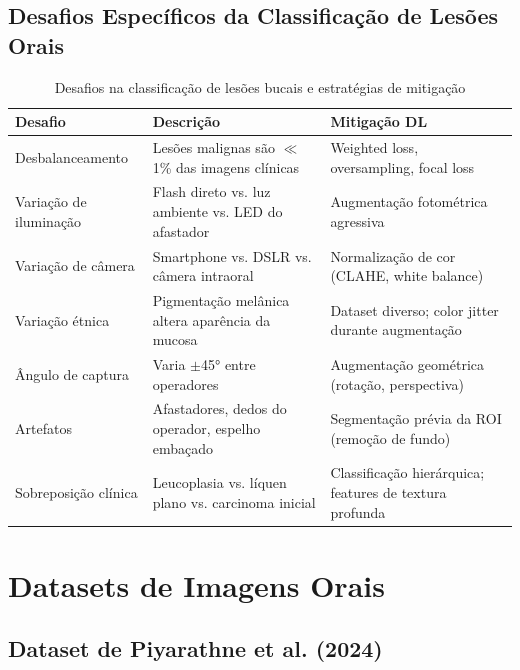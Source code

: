 \subsection{Desafios Específicos da Classificação de Lesões Orais}

\begin{table}[H]
  \centering
  \caption{Desafios na classificação de lesões bucais e estratégias de mitigação}
  \label{tab:desafios-lesoes}
  \begin{tabularx}{\textwidth}{p{3cm}Xp{4cm}}
    \toprule
    \textbf{Desafio} & \textbf{Descrição} & \textbf{Mitigação DL} \\
    \midrule
    Desbalanceamento & Lesões malignas são $\ll$ 1\% das imagens clínicas &
        Weighted loss, oversampling, focal loss \\
    Variação de iluminação & Flash direto vs. luz ambiente vs. LED do afastador &
        Augmentação fotométrica agressiva \\
    Variação de câmera & Smartphone vs. DSLR vs. câmera intraoral &
        Normalização de cor (CLAHE, white balance) \\
    Variação étnica & Pigmentação melânica altera aparência da mucosa &
        Dataset diverso; color jitter durante augmentação \\
    Ângulo de captura & Varia $\pm$45° entre operadores &
        Augmentação geométrica (rotação, perspectiva) \\
    Artefatos & Afastadores, dedos do operador, espelho embaçado &
        Segmentação prévia da ROI (remoção de fundo) \\
    Sobreposição clínica & Leucoplasia vs. líquen plano vs. carcinoma inicial &
        Classificação hierárquica; features de textura profunda \\
    \bottomrule
  \end{tabularx}
\end{table}

\section{Datasets de Imagens Orais}
\label{sec:datasets-orais}

\subsection{Dataset de Piyarathne et al. (2024)}

